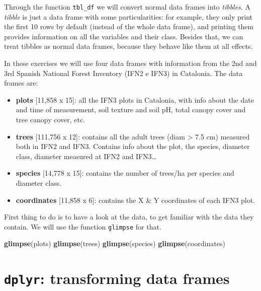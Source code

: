 \documentclass[]{article}
\newenvironment{Shaded}{\begin{snugshade}}{\end{snugshade}}
\newcommand{\KeywordTok}[1]{\textcolor[rgb]{0.13,0.29,0.53}{\textbf{#1}}}
\newcommand{\NormalTok}[1]{#1}
\begin{document}
Through the function \texttt{tbl\_df} we will convert normal data frames
into \emph{tibbles}. A \emph{tibble} is just a data frame with some
particularities: for example, they only print the first 10 rows by
default (instead of the whole data frame), and printing them provides
information on all the variables and their class. Besides that, we can
treat tibbles as normal data frames, because they behave like them at
all effects.

In these exercises we will use four data frames with information from
the 2nd and 3rd Spanish National Forest Inventory (IFN2 e IFN3) in
Catalonia. The data frames are:

\begin{itemize}
\item
  \textbf{plots} {[}11,858 x 15{]}: all the IFN3 plots in Catalonia,
  with info about the date and time of measurement, soil texture and
  soil pH, total canopy cover and tree canopy cover, etc.
\item
  \textbf{trees} {[}111,756 x 12{]}: contains all the adult trees (diam
  \textgreater{} 7.5 cm) measured both in IFN2 and IFN3. Contains info
  about the plot, the species, diameter class, diameter measured at IFN2
  and IFN3\ldots{}
\item
  \textbf{species} {[}14,778 x 15{]}: contains the number of trees/ha
  per species and diameter class.
\item
  \textbf{coordinates} {[}11,858 x 6{]}: contains the X \& Y coordinates
  of each IFN3 plot.
\end{itemize}

First thing to do is to have a look at the data, to get familiar with
the data they contain. We will use the function \texttt{glimpse} for
that.

\begin{Shaded}
\begin{Highlighting}[]
\KeywordTok{glimpse}\NormalTok{(plots)}
\KeywordTok{glimpse}\NormalTok{(trees)}
\KeywordTok{glimpse}\NormalTok{(species)}
\KeywordTok{glimpse}\NormalTok{(coordinates)}
\end{Highlighting}
\end{Shaded}

\newpage

\newpage

\section{\texorpdfstring{\texttt{dplyr}: transforming data
frames}{dplyr: transforming data frames}}\label{dplyr-transforming-data-frames}
\end{document}
